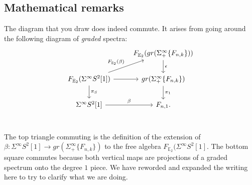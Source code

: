 \documentclass[reqno, oneside]{amsart}
\theoremstyle{definition}
\theoremstyle{plain}
\DeclareMathOperator{\E}{\mathbb{E}}
\begin{document}
\subsection{Mathematical remarks}



The diagram that you draw does indeed commute.  It arises from going around the following diagram of \emph{graded} spectra:
$$
\begin{tikzcd}
 & F_{\E_2}( gr(\Sigma^{\infty}_+\{F_{n,k}\}) )\arrow[d,"\epsilon"] \\
F_{\E_2}(\Sigma^{\infty}S^2[1]) \arrow[ru, "F_{\E_2}(\beta)"] \arrow[r]\arrow[d,"\pi_S"] & gr(\Sigma^{\infty}_+ \{ F_{n,k}\} ) \arrow[d,"\pi_1"] \\
\Sigma^{\infty} S^2[1] \arrow[r,"\beta"]& F_{n,1}.\\
\end{tikzcd}
$$

The top triangle commuting is the definition of the extension of $\beta: \Sigma^{\infty}S^2[1] \to gr(\Sigma^{\infty}_+ \{F_{n,k} \} )$ to the free algebra $F_{\E_2} (\Sigma^{\infty} S^2[1]$.  The bottom square commutes because both vertical maps are projections of a graded spectrum onto the degree $1$ piece.  We have reworded and expanded the writing here to try to clarify what we are doing.  
\end{document}
